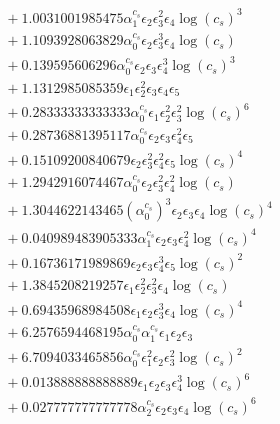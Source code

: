 \documentclass[10pt]{article}
\begin{document}
\begin{align*}
&{}  + 1.0031001985475 \alpha_{1}^{c_s} \epsilon_{2} \epsilon_{3}^{2} \epsilon_{4} \log{\left(c_{s} \right)}^{3} \\
&{}  + 1.1093928063829 \alpha_{0}^{c_s} \epsilon_{2} \epsilon_{3}^{3} \epsilon_{4} \log{\left(c_{s} \right)} \\
&{}  + 0.139595606296 \alpha_{0}^{c_s} \epsilon_{2} \epsilon_{3} \epsilon_{4}^{3} \log{\left(c_{s} \right)}^{3} \\
&{}  + 1.1312985085359 \epsilon_{1} \epsilon_{2}^{2} \epsilon_{3} \epsilon_{4} \epsilon_{5} \\
&{}  + 0.28333333333333 \alpha_{0}^{c_s} \epsilon_{1} \epsilon_{2}^{2} \epsilon_{3}^{2} \log{\left(c_{s} \right)}^{6} \\
&{}  + 0.28736881395117 \alpha_{0}^{c_s} \epsilon_{2} \epsilon_{3} \epsilon_{4}^{2} \epsilon_{5} \\
&{}  + 0.15109200840679 \epsilon_{2} \epsilon_{3}^{2} \epsilon_{4}^{2} \epsilon_{5} \log{\left(c_{s} \right)}^{4} \\
&{}  + 1.2942916074467 \alpha_{0}^{c_s} \epsilon_{2} \epsilon_{3}^{2} \epsilon_{4}^{2} \log{\left(c_{s} \right)} \\
&{}  + 1.3044622143465 \left(\alpha_{0}^{c_s}\right)^{3} \epsilon_{2} \epsilon_{3} \epsilon_{4} \log{\left(c_{s} \right)}^{4} \\
&{}  + 0.040989483905333 \alpha_{1}^{c_s} \epsilon_{2} \epsilon_{3} \epsilon_{4}^{2} \log{\left(c_{s} \right)}^{4} \\
&{}  + 0.16736171989869 \epsilon_{2} \epsilon_{3} \epsilon_{4}^{3} \epsilon_{5} \log{\left(c_{s} \right)}^{2} \\
&{}  + 1.3845208219257 \epsilon_{1} \epsilon_{2}^{2} \epsilon_{3}^{2} \epsilon_{4} \log{\left(c_{s} \right)} \\
&{}  + 0.69435968984508 \epsilon_{1} \epsilon_{2} \epsilon_{3}^{3} \epsilon_{4} \log{\left(c_{s} \right)}^{4} \\
&{}  + 6.2576594468195 \alpha_{0}^{c_s} \alpha_{1}^{c_s} \epsilon_{1} \epsilon_{2} \epsilon_{3} \\
&{}  + 6.7094033465856 \alpha_{0}^{c_s} \epsilon_{1}^{2} \epsilon_{2} \epsilon_{3}^{2} \log{\left(c_{s} \right)}^{2} \\
&{}  + 0.013888888888889 \epsilon_{1} \epsilon_{2} \epsilon_{3} \epsilon_{4}^{3} \log{\left(c_{s} \right)}^{6} \\
&{}  + 0.027777777777778 \alpha_{2}^{c_s} \epsilon_{2} \epsilon_{3} \epsilon_{4} \log{\left(c_{s} \right)}^{6} \\

\end{align*}
\end{document}
